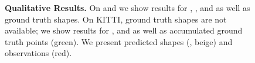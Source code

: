 \begin{figure}
\begin{subfigure}[t]{0.1\textwidth}
    \end{subfigure}
    \vspace*{-6px}
    \caption{{\bf Qualitative Results.} On \clean and \noisy we show results for \ML, \cite{Engelmann2016GCPR}, \AML and \Sup as well as ground truth shapes. On KITTI, ground truth shapes are not available; we show results for \cite{Engelmann2016GCPR}, \AML and \Sup as well as accumulated ground truth points ({\color{rgreen}green}). We present predicted shapes (, {\color{rbeige}beige}) and observations ({\color{rred}red}).}
    \label{fig:experiments-shapenet-kitti}
    \vspace*{-0.25cm}
\end{figure}